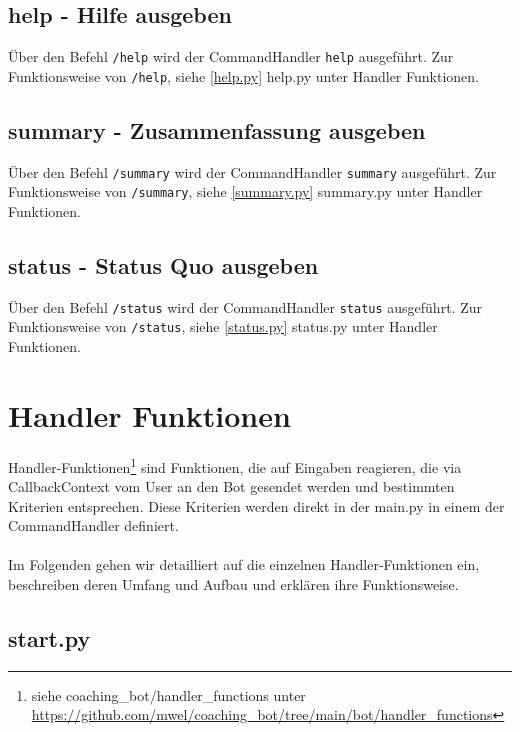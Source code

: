         \subsection{help - Hilfe ausgeben}
            Über den Befehl \verb|/help| wird der CommandHandler \verb|help| ausgeführt. Zur Funktionsweise von \verb|/help|, siehe \ref{help.py} help.py unter Handler Funktionen. 


        \subsection{summary - Zusammenfassung ausgeben}
            Über den Befehl \verb|/summary| wird der CommandHandler \verb|summary| ausgeführt. Zur Funktionsweise von \verb|/summary|, siehe \ref{summary.py} summary.py unter Handler Funktionen. 


        \subsection{status - Status Quo ausgeben}
            Über den Befehl \verb|/status| wird der CommandHandler \verb|status| ausgeführt. Zur Funktionsweise von \verb|/status|, siehe \ref{status.py} status.py unter Handler Funktionen. 


    \section{Handler Funktionen}
        Handler-Funktionen\footnote{siehe coaching\_bot/handler\_functions unter \url{https://github.com/mwel/coaching_bot/tree/main/bot/handler_functions}} sind Funktionen, die auf Eingaben reagieren, die via CallbackContext vom User an den Bot gesendet werden und bestimmten Kriterien entsprechen. Diese Kriterien werden direkt in der main.py in einem der CommandHandler definiert. \\
        \\
        Im Folgenden gehen wir detailliert auf die einzelnen Handler-Funktionen ein, beschreiben deren Umfang und Aufbau und erklären ihre Funktionsweise. 

        \subsection{start.py} \label{start.py}

